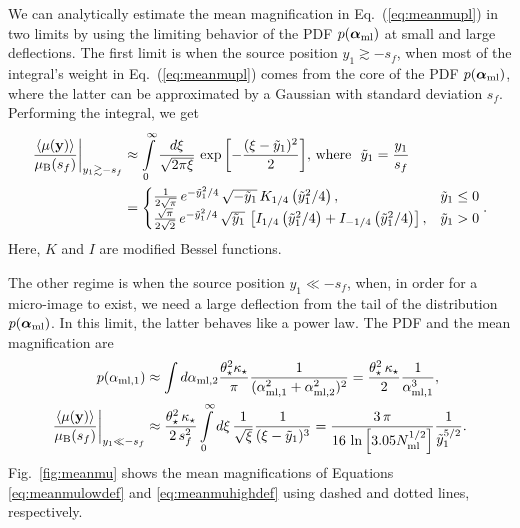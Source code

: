 \documentclass{aastex6}
\newcommand{\bt}[1]{\mathbf #1}
\newcommand{\refeq}[1]{Eq.~(\ref{eq:#1})}
\newcommand{\reffig}[1]{Fig.~\ref{fig:#1}}
\begin{document}
We can analytically estimate the mean magnification in \refeq{meanmupl} in 
two limits by using the limiting behavior of the PDF $p(\bm{\alpha}_{\rm ml})$ at small and 
large deflections. The first limit is when the source position $y_1 \gtrsim -s_f$, when most 
of the integral's weight in \refeq{meanmupl} comes from the core of the 
PDF $p(\bm{\alpha}_{\rm ml})$, where the latter can be approximated by a Gaussian with 
standard deviation $s_f$. Performing the integral, we get
\begin{align}
  \frac{\langle \mu(\bt y) \rangle}{\mu_{\rm B}(s_f)} \biggr\vert_{y_1 \gtrsim -s_f} & \approx \int\limits_{0}^{\infty} \frac{d\xi}{\sqrt{2 \pi \xi}} \, \exp{\left[ - \frac{(\xi - \tilde{y}_1)^2}{2} \right]}, \, {\rm where} \,\,\,\, \tilde{y}_1 = \frac{y_1}{s_f} \\
  & = \begin{cases}
          \frac{1}{2\sqrt{\pi}}\, e^{-\tilde{y}_1^2/4}\, \sqrt{-\tilde{y}_1}\, K_{1/4}\left( \tilde{y}_1^2/4 \right), & \tilde{y}_1 \leq 0 \\
          \frac{\sqrt{\pi}}{2\sqrt{2}}\, e^{-\tilde{y}_1^2/4}\, \sqrt{\tilde{y}_1}\, \left[ I_{1/4}\left( \tilde{y}_1^2/4 \right) + I_{-1/4}\left( \tilde{y}_1^2/4 \right) \right], & \tilde{y}_1 > 0
        \end{cases}. \label{eq:meanmulowdef}
\end{align}
Here, $K$ and $I$ are modified Bessel functions.

The other regime is when the source position $y_1 \ll -s_f$, when, in order for a micro-image to exist, 
we need a large deflection from the tail of the distribution $p(\bm{\alpha}_{\rm ml})$. In this limit, 
the latter behaves like a power law. The PDF and the mean magnification are
\begin{align}
  p(\alpha_{\rm ml, 1}) & \approx \int d\alpha_{\rm ml, 2}  \frac{\theta_\star^2 \kappa_\star}{\pi} \frac{1}{(\alpha_{\rm ml, 1}^2 + \alpha_{\rm ml, 2}^2)^2} = \frac{\theta_\star^2\, \kappa_\star}{2} \frac{1}{\alpha_{\rm ml, 1}^3}, \\
  \frac{\langle \mu(\bt y) \rangle}{\mu_{\rm B}(s_f)} \biggr\vert_{y_1 \ll -s_f} & \approx \frac{\theta_\star^2\, \kappa_\star}{2\, s_f^2} \int\limits_{0}^{\infty} d\xi \, \frac{1}{\sqrt{\xi}} \frac{1}{(\xi - \tilde{y}_1)^3} = \frac{3\,\pi}{16 \, \ln{\left[ 3.05 N_{\rm ml}^{1/2} \right]} } \frac{1}{\tilde{y}_1^{5/2}}. \label{eq:meanmuhighdef}
\end{align}
\reffig{meanmu} shows the mean magnifications of Equations \eqref{eq:meanmulowdef} and 
\eqref{eq:meanmuhighdef} using dashed and dotted lines, respectively.
\end{document}
